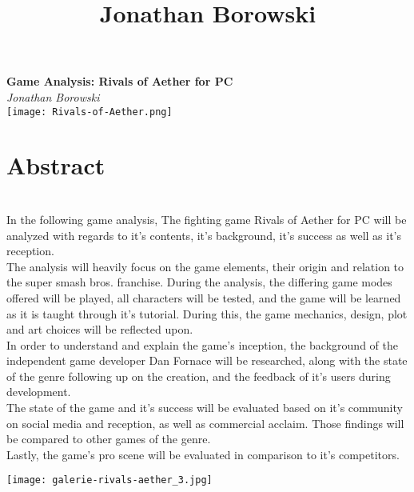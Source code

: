 \documentclass{article}
\begin{document}
\begin{titlepage}
   \begin{center}
      \Large\textbf{Game Analysis: Rivals of Aether for PC}\\
      \large\textit{Jonathan Borowski}\\
      
      \texttt{[image: Rivals-of-Aether.png]}      
   \end{center}
\end{titlepage}
\title{Jonathan Borowski}
\chapter{\textbf{Abstract}}\\
In the following game analysis, The fighting game Rivals of Aether for PC will be analyzed with regards to it's contents, it's background, it's success as well as it's reception.\\
The analysis will heavily focus on the game elements, their origin and relation to the super smash bros. franchise. During the analysis, the differing game modes offered will be played, all characters will be tested, and the game will be learned as it is taught through it's tutorial. During this, the game mechanics, design, plot and art choices will be reflected upon.\\
In order to understand and explain the game's inception, the background of the independent game developer Dan Fornace will be researched, along with the state of the genre following up on the creation, and the feedback of it's users during development.\\
The state of the game and it's success will be evaluated based on it's community on social media and reception, as well as commercial acclaim. Those findings will be compared to other games of the genre.\\Lastly, the game's pro scene will be evaluated in comparison to it's competitors.\\

\begin{center}
	\texttt{[image: galerie-rivals-aether\_3.jpg]}
\end{center}
\end{document}
